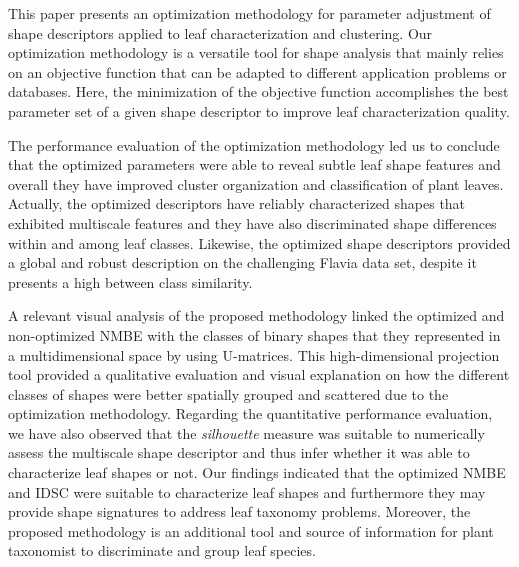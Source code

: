 This paper presents an optimization methodology for parameter adjustment of shape descriptors applied to leaf characterization and clustering. Our optimization methodology is a versatile tool for shape analysis that mainly relies on an objective function that can be adapted to different application problems or databases. Here, the minimization of the objective function accomplishes the best parameter set of a given shape descriptor to improve leaf characterization quality. 

The performance evaluation of the optimization methodology led us to conclude that the optimized parameters were able to reveal subtle leaf shape features and overall they have improved cluster organization and classification of plant leaves.
Actually, the optimized descriptors have reliably characterized shapes that exhibited multiscale features and they have also discriminated shape differences within and among leaf classes.
Likewise, the optimized shape descriptors provided a global and robust description on the challenging Flavia data set,  despite it presents a high between class similarity.

A relevant visual analysis of the proposed methodology linked the optimized and non-optimized NMBE with the classes of binary shapes that they represented in a multidimensional space by using U-matrices. This high-dimensional projection tool provided a qualitative evaluation and visual explanation on how the different classes of shapes were better spatially grouped and scattered due to the optimization methodology. Regarding the quantitative performance evaluation,  we have also observed that the \emph{silhouette} measure was suitable to numerically assess the multiscale shape descriptor and thus infer whether it was able to characterize leaf shapes or not. Our findings indicated that the optimized NMBE and IDSC were suitable to characterize leaf shapes and furthermore they may provide shape signatures to address leaf  taxonomy problems. Moreover, the proposed methodology is an additional tool and source of information for plant taxonomist to discriminate and group leaf species.

